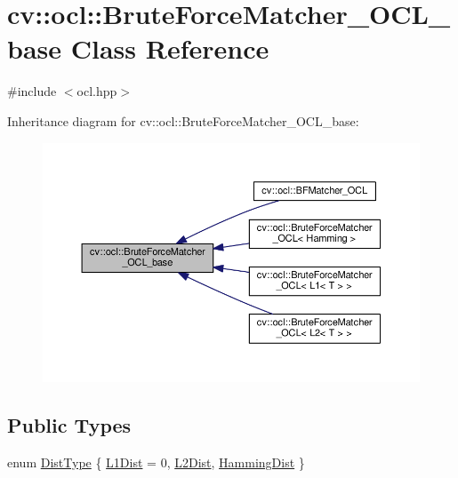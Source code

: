 \hypertarget{classcv_1_1ocl_1_1BruteForceMatcher__OCL__base}{\section{cv\-:\-:ocl\-:\-:Brute\-Force\-Matcher\-\_\-\-O\-C\-L\-\_\-base Class Reference}
\label{classcv_1_1ocl_1_1BruteForceMatcher__OCL__base}
}


{\ttfamily \#include $<$ocl.\-hpp$>$}



Inheritance diagram for cv\-:\-:ocl\-:\-:Brute\-Force\-Matcher\-\_\-\-O\-C\-L\-\_\-base\-:\nopagebreak
\begin{figure}[H]
\begin{center}
\leavevmode
\includegraphics[width=350pt]{classcv_1_1ocl_1_1BruteForceMatcher__OCL__base__inherit__graph}
\end{center}
\end{figure}
\subsection*{Public Types}
\begin{DoxyCompactItemize}
\item 
enum \hyperlink{classcv_1_1ocl_1_1BruteForceMatcher__OCL__base_a138bb23658e4007b7bb3c0f294075e68}{Dist\-Type} \{ \hyperlink{classcv_1_1ocl_1_1BruteForceMatcher__OCL__base_a138bb23658e4007b7bb3c0f294075e68ae44fa0b7a196ce3e007c059ab182a9bf}{L1\-Dist} = 0, 
\hyperlink{classcv_1_1ocl_1_1BruteForceMatcher__OCL__base_a138bb23658e4007b7bb3c0f294075e68a72ee9970d2cadd04468a41459aece56e}{L2\-Dist}, 
\hyperlink{classcv_1_1ocl_1_1BruteForceMatcher__OCL__base_a138bb23658e4007b7bb3c0f294075e68ab5d3cbb0b1f2f5d3a196658e2eac4e2b}{Hamming\-Dist}
 \}
\end{DoxyCompactItemize}
